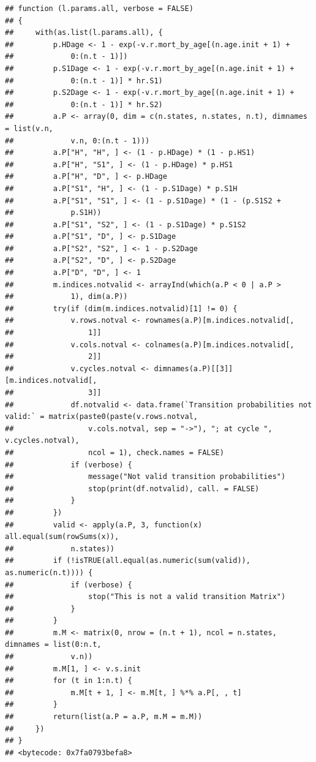\documentclass[]{article}
\begin{document}
\begin{verbatim}
## function (l.params.all, verbose = FALSE) 
## {
##     with(as.list(l.params.all), {
##         p.HDage <- 1 - exp(-v.r.mort_by_age[(n.age.init + 1) + 
##             0:(n.t - 1)])
##         p.S1Dage <- 1 - exp(-v.r.mort_by_age[(n.age.init + 1) + 
##             0:(n.t - 1)] * hr.S1)
##         p.S2Dage <- 1 - exp(-v.r.mort_by_age[(n.age.init + 1) + 
##             0:(n.t - 1)] * hr.S2)
##         a.P <- array(0, dim = c(n.states, n.states, n.t), dimnames = list(v.n, 
##             v.n, 0:(n.t - 1)))
##         a.P["H", "H", ] <- (1 - p.HDage) * (1 - p.HS1)
##         a.P["H", "S1", ] <- (1 - p.HDage) * p.HS1
##         a.P["H", "D", ] <- p.HDage
##         a.P["S1", "H", ] <- (1 - p.S1Dage) * p.S1H
##         a.P["S1", "S1", ] <- (1 - p.S1Dage) * (1 - (p.S1S2 + 
##             p.S1H))
##         a.P["S1", "S2", ] <- (1 - p.S1Dage) * p.S1S2
##         a.P["S1", "D", ] <- p.S1Dage
##         a.P["S2", "S2", ] <- 1 - p.S2Dage
##         a.P["S2", "D", ] <- p.S2Dage
##         a.P["D", "D", ] <- 1
##         m.indices.notvalid <- arrayInd(which(a.P < 0 | a.P > 
##             1), dim(a.P))
##         try(if (dim(m.indices.notvalid)[1] != 0) {
##             v.rows.notval <- rownames(a.P)[m.indices.notvalid[, 
##                 1]]
##             v.cols.notval <- colnames(a.P)[m.indices.notvalid[, 
##                 2]]
##             v.cycles.notval <- dimnames(a.P)[[3]][m.indices.notvalid[, 
##                 3]]
##             df.notvalid <- data.frame(`Transition probabilities not valid:` = matrix(paste0(paste(v.rows.notval, 
##                 v.cols.notval, sep = "->"), "; at cycle ", v.cycles.notval), 
##                 ncol = 1), check.names = FALSE)
##             if (verbose) {
##                 message("Not valid transition probabilities")
##                 stop(print(df.notvalid), call. = FALSE)
##             }
##         })
##         valid <- apply(a.P, 3, function(x) all.equal(sum(rowSums(x)), 
##             n.states))
##         if (!isTRUE(all.equal(as.numeric(sum(valid)), as.numeric(n.t)))) {
##             if (verbose) {
##                 stop("This is not a valid transition Matrix")
##             }
##         }
##         m.M <- matrix(0, nrow = (n.t + 1), ncol = n.states, dimnames = list(0:n.t, 
##             v.n))
##         m.M[1, ] <- v.s.init
##         for (t in 1:n.t) {
##             m.M[t + 1, ] <- m.M[t, ] %*% a.P[, , t]
##         }
##         return(list(a.P = a.P, m.M = m.M))
##     })
## }
## <bytecode: 0x7fa0793befa8>
\end{verbatim}
\end{document}
